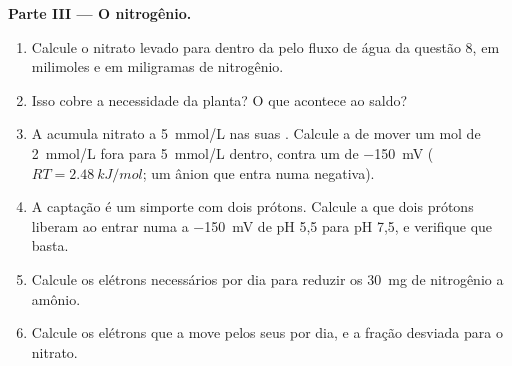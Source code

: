 \begin{problem}
\medskip
\noindent\textbf{Parte III --- O nitrogênio.}
\begin{enumerate}[resume]
  \item Calcule o nitrato levado para dentro da  pelo fluxo de
        água da questão 8, em milimoles e em miligramas de nitrogênio.
  \item Isso cobre a necessidade da planta? O que acontece ao saldo?
  \item A  acumula nitrato a \qty{5}{mmol/L} nas suas .
        Calcule a  de mover um mol de \qty{2}{mmol/L}
        fora para \qty{5}{mmol/L} dentro, contra um  de \qty{-150}{mV} ($RT = \qty{2.48}{kJ/mol}$; um
        ânion que entra numa  negativa).
  \item A captação é um simporte com dois prótons. Calcule a  que dois prótons liberam ao entrar numa  a
        \qty{-150}{mV} de pH 5,5 para pH 7,5, e verifique que basta.
  \item Calcule os elétrons necessários por dia para reduzir os
        \qty{30}{mg} de nitrogênio a amônio.
  \item Calcule os elétrons que a  move pelos seus 
        por dia, e a fração desviada para o nitrato.
\end{enumerate}


\end{problem}

